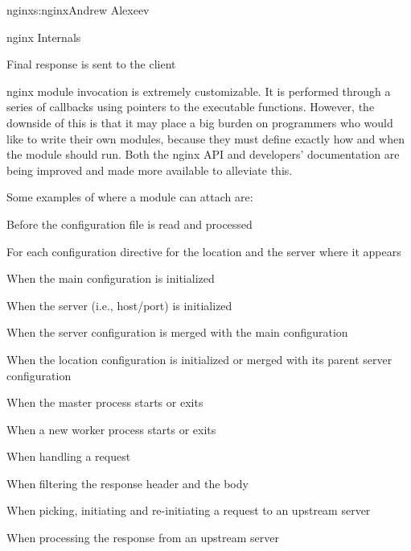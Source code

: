 \begin{aosachapter}{nginx}{s:nginx}{Andrew Alexeev}
\begin{aosasect1}{nginx Internals}
\begin{aosaenumerate}
\item Final response is sent to the client

\end{aosaenumerate}

nginx module invocation is extremely customizable. It is performed
through a series of callbacks using pointers to the executable
functions. However, the downside of this is that it may place a big
burden on programmers who would like to write their own modules,
because they must define exactly how and when the module should
run. Both the nginx API and developers' documentation are being
improved and made more available to alleviate this.

Some examples of where a module can attach are:

\begin{aosaitemize}

\item Before the configuration file is read and processed

\item For each configuration directive for the location and the server
  where it appears

\item When the main configuration is initialized

\item When the server (i.e., host/port) is initialized

\item When the server configuration is merged with the main
  configuration

\item When the location configuration is initialized or merged with
  its parent server configuration

\item When the master process starts or exits

\item When a new worker process starts or exits

\item When handling a request

\item When filtering the response header and the body

\item When picking, initiating and re-initiating a request to an
  upstream server

\item When processing the response from an upstream server


\end{aosaitemize}
\end{aosasect1}
\end{aosachapter}
